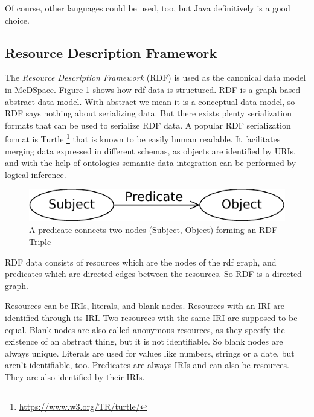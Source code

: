 Of course, other languages could be used, too, but Java definitively is a good choice.


\subsection{Resource Description Framework}

The \emph{Resource Description Framework} (RDF) \cite{w3RDF} is used as the canonical data model in MeDSpace. Figure \ref{RdfTriple} shows how rdf data is structured. RDF is a graph-based abstract data model. With abstract we mean it is a conceptual data model, so RDF says nothing about serializing data. But there exists plenty serialization formats that can be used to serialize RDF data. A popular RDF serialization format is Turtle \footnote{\url{https://www.w3.org/TR/turtle/}} that is known to be easily human readable.
It facilitates merging data expressed in different schemas, as objects are identified by URIs, and with the help of ontologies semantic data integration can be performed by logical inference. 


\begin{figure}[H]
	\begin{center}
		\includegraphics[scale=0.75]{figures/rdf-graph.pdf}
	\end{center}
	\caption{A predicate connects two nodes (Subject, Object) forming an RDF Triple}
	\label{RdfTriple}
	\footnotemark
\end{figure}

RDF data consists of resources which are the nodes of the rdf graph, and predicates which are directed edges between the resources. So RDF is a directed graph. 

Resources can be IRIs, literals, and blank nodes. 
Resources with an IRI are identified through its IRI. Two resources with the same IRI are supposed to be equal.
Blank nodes are also called anonymous resources, as they specify the existence of an abstract thing, but it is not identifiable. So blank nodes are always unique.
Literals are used for values like numbers, strings or a date, but aren't identifiable, too.
Predicates are always IRIs and can also be resources. They are also identified by their IRIs.

